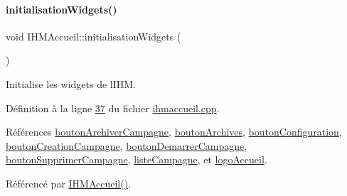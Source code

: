 \mbox{\label{class_i_h_m_accueil_a1385a94c1a3d75d813429dc9bdc4b050}} 
\paragraph{\texorpdfstring{initialisation\+Widgets()}{initialisationWidgets()}}
{\footnotesize\ttfamily void I\+H\+M\+Accueil\+::initialisation\+Widgets (\begin{DoxyParamCaption}{ }\end{DoxyParamCaption})\hspace{0.3cm}{\ttfamily [private]}}



Initialise les widgets de l\textquotesingle{}I\+HM. 



Définition à la ligne \hyperlink{ihmaccueil_8cpp_source_l00037}{37} du fichier \hyperlink{ihmaccueil_8cpp_source}{ihmaccueil.\+cpp}.



Références \hyperlink{ihmaccueil_8h_source_l00035}{bouton\+Archiver\+Campagne}, \hyperlink{ihmaccueil_8h_source_l00031}{bouton\+Archives}, \hyperlink{ihmaccueil_8h_source_l00032}{bouton\+Configuration}, \hyperlink{ihmaccueil_8h_source_l00033}{bouton\+Creation\+Campagne}, \hyperlink{ihmaccueil_8h_source_l00034}{bouton\+Demarrer\+Campagne}, \hyperlink{ihmaccueil_8h_source_l00036}{bouton\+Supprimer\+Campagne}, \hyperlink{ihmaccueil_8h_source_l00037}{liste\+Campagne}, et \hyperlink{ihmaccueil_8h_source_l00038}{logo\+Accueil}.



Référencé par \hyperlink{ihmaccueil_8cpp_source_l00014}{I\+H\+M\+Accueil()}.


